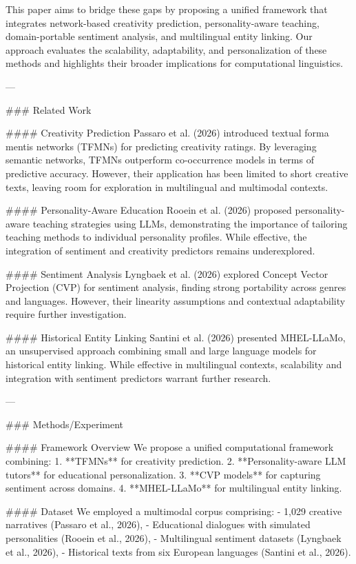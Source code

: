This paper aims to bridge these gaps by proposing a unified framework that integrates network-based creativity prediction, personality-aware teaching, domain-portable sentiment analysis, and multilingual entity linking. Our approach evaluates the scalability, adaptability, and personalization of these methods and highlights their broader implications for computational linguistics.

---

### Related Work

#### Creativity Prediction
Passaro et al. (2026) introduced textual forma mentis networks (TFMNs) for predicting creativity ratings. By leveraging semantic networks, TFMNs outperform co-occurrence models in terms of predictive accuracy. However, their application has been limited to short creative texts, leaving room for exploration in multilingual and multimodal contexts.

#### Personality-Aware Education
Rooein et al. (2026) proposed personality-aware teaching strategies using LLMs, demonstrating the importance of tailoring teaching methods to individual personality profiles. While effective, the integration of sentiment and creativity predictors remains underexplored.

#### Sentiment Analysis
Lyngbaek et al. (2026) explored Concept Vector Projection (CVP) for sentiment analysis, finding strong portability across genres and languages. However, their linearity assumptions and contextual adaptability require further investigation.

#### Historical Entity Linking
Santini et al. (2026) presented MHEL-LLaMo, an unsupervised approach combining small and large language models for historical entity linking. While effective in multilingual contexts, scalability and integration with sentiment predictors warrant further research.

---

### Methods/Experiment

#### Framework Overview
We propose a unified computational framework combining:
1. **TFMNs** for creativity prediction.
2. **Personality-aware LLM tutors** for educational personalization.
3. **CVP models** for capturing sentiment across domains.
4. **MHEL-LLaMo** for multilingual entity linking.

#### Dataset
We employed a multimodal corpus comprising:
- 1,029 creative narratives (Passaro et al., 2026),
- Educational dialogues with simulated personalities (Rooein et al., 2026),
- Multilingual sentiment datasets (Lyngbaek et al., 2026),
- Historical texts from six European languages (Santini et al., 2026).

